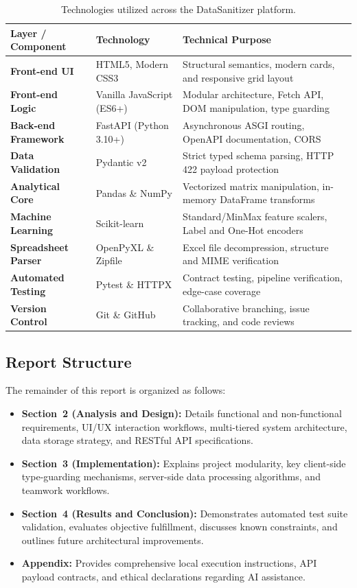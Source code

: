 \begin{table}[ht]
\centering\small
\renewcommand{\arraystretch}{1.2}
\begin{tabular}{@{}lll@{}}
\toprule
\textbf{Layer / Component} & \textbf{Technology} & \textbf{Technical Purpose}\\
\midrule
\textbf{Front-end UI}       & HTML5, Modern CSS3      & Structural semantics, modern cards, and responsive grid layout\\
\textbf{Front-end Logic}    & Vanilla JavaScript (ES6+) & Modular architecture, Fetch API, DOM manipulation, type guarding\\
\textbf{Back-end Framework} & FastAPI (Python 3.10+)  & Asynchronous ASGI routing, OpenAPI documentation, CORS\\
\textbf{Data Validation}    & Pydantic v2             & Strict typed schema parsing, HTTP 422 payload protection\\
\textbf{Analytical Core}    & Pandas \& NumPy         & Vectorized matrix manipulation, in-memory DataFrame transforms\\
\textbf{Machine Learning}   & Scikit-learn            & Standard/MinMax feature scalers, Label and One-Hot encoders\\
\textbf{Spreadsheet Parser} & OpenPyXL \& Zipfile     & Excel file decompression, structure and MIME verification\\
\textbf{Automated Testing}  & Pytest \& HTTPX         & Contract testing, pipeline verification, edge-case coverage\\
\textbf{Version Control}    & Git \& GitHub           & Collaborative branching, issue tracking, and code reviews\\
\bottomrule
\end{tabular}
\caption{Technologies utilized across the DataSanitizer platform.}
\label{tab:tech}
\end{table}

\subsection{Report Structure}
The remainder of this report is organized as follows:
\begin{itemize}
  \item \textbf{Section~2 (Analysis and Design):} Details functional and non-functional requirements, UI/UX interaction workflows, multi-tiered system architecture, data storage strategy, and RESTful API specifications.
  \item \textbf{Section~3 (Implementation):} Explains project modularity, key client-side type-guarding mechanisms, server-side data processing algorithms, and teamwork workflows.
  \item \textbf{Section~4 (Results and Conclusion):} Demonstrates automated test suite validation, evaluates objective fulfillment, discusses known constraints, and outlines future architectural improvements.
  \item \textbf{Appendix:} Provides comprehensive local execution instructions, API payload contracts, and ethical declarations regarding AI assistance.
\end{itemize}
